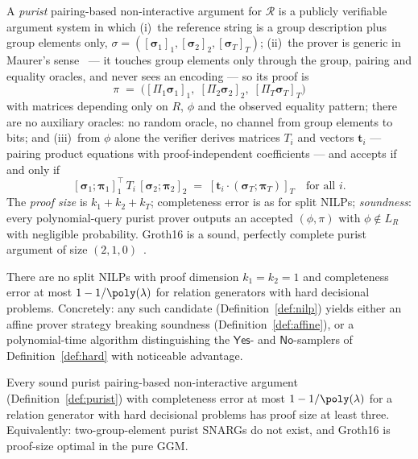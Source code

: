 \documentclass{conjura-conjecture}
\newcommand{\bsig}{\boldsymbol{\sigma}}
\newcommand{\bpi}{\boldsymbol{\pi}}
\newcommand{\LR}{L_R}
\newcommand{\Yes}{\mathsf{Yes}}
\newcommand{\No}{\mathsf{No}}
\begin{document}
\begin{definition}\label{def:purist}
A \emph{purist} pairing-based non-interactive argument for
$\mathcal{R}$ is a publicly verifiable argument system in which
(i)~the reference string is a group description plus group elements
only, $\sigma = ([\bsig_1]_1,\allowbreak [\bsig_2]_2,\allowbreak
[\bsig_T]_T)$;
(ii)~the prover is generic in Maurer's sense~\cite{Mau05} --- it
touches group elements only through the group, pairing and equality
oracles, and never sees an encoding --- so its proof is
\[
  \pi \;=\; \bigl([\Pi_1\bsig_1]_1,\; [\Pi_2\bsig_2]_2,\;
  [\Pi_T\bsig_T]_T\bigr)
\]
with matrices depending only on $R$, $\phi$ and the observed equality
pattern; there are no auxiliary oracles: no random oracle, no channel
from group elements to bits;
and (iii)~from $\phi$ alone the verifier derives matrices $T_i$ and
vectors $\boldsymbol{t}_i$ --- pairing product equations with
proof-independent coefficients --- and accepts if and only if
\[
  [\bsig_1;\bpi_1]_1^{\!\top} \, T_i \, [\bsig_2;\bpi_2]_2
  \;=\; [\boldsymbol{t}_i \cdot (\bsig_T;\bpi_T)]_T
  \quad \text{for all } i .
\]
The \emph{proof size} is $k_1 + k_2 + k_T$;
completeness error is as for split NILPs; \emph{soundness}: every
polynomial-query purist prover outputs an accepted $(\phi,\pi)$ with
$\phi \notin \LR$ with negligible probability.  Groth16 is a sound,
perfectly complete purist argument of size $(2,1,0)$~\cite{Gro16}.
\end{definition}

\begin{conjecture}\label{conj:nilp}
There are no split NILPs with proof dimension $k_1 = k_2 = 1$ and
completeness error at most $1 - 1/\poly(\lambda)$ for relation
generators with hard decisional problems.  Concretely: any such
candidate (Definition~\ref{def:nilp}) yields either an affine prover
strategy breaking soundness (Definition~\ref{def:affine}), or a
polynomial-time algorithm distinguishing the $\Yes$- and
$\No$-samplers of Definition~\ref{def:hard} with noticeable
advantage.
\end{conjecture}

\begin{conjecture}\label{conj:ggm}
Every sound purist pairing-based non-interactive argument
(Definition~\ref{def:purist}) with completeness error at most
$1 - 1/\poly(\lambda)$ for a relation generator with hard decisional
problems has proof size at least three.  Equivalently:
two-group-element purist SNARGs do not exist, and Groth16 is
proof-size optimal in the pure GGM.
\end{conjecture}
\end{document}
